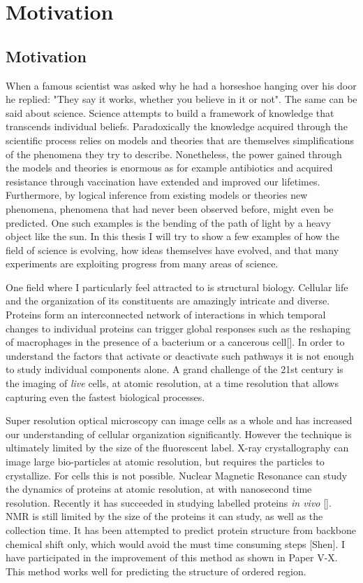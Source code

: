 \part{Motivation}
\chapter{Motivation}
When a famous scientist was asked why he had a horseshoe hanging over his door he replied: "They say it works, whether you believe in it or not". The same can be said about science. Science attempts to build a framework of knowledge that transcends individual beliefs. Paradoxically the knowledge acquired through the scientific process relies on models and theories that are themselves simplifications of the phenomena they try to describe. Nonetheless, the power gained through the models and theories is enormous as for example antibiotics and acquired resistance through vaccination have extended and improved our lifetimes. Furthermore, by logical inference from existing models or theories new phenomena, phenomena that had never been observed before, might even be predicted. One such examples is the bending of the path of light by a heavy object like the sun. In this thesis I will try to show a few examples of how the field of science is evolving, how ideas themselves have evolved, and that many experiments are exploiting progress from many areas of science.

One field where I particularly feel attracted to is structural biology. Cellular life and the organization of its constituents are amazingly intricate and diverse. Proteins form an interconnected network of interactions in which temporal changes to individual proteins can trigger global responses such as the reshaping of macrophages in the presence of a bacterium or a cancerous cell[]. In order to understand the factors that activate or deactivate such pathways it is not enough to study individual components alone. A grand challenge of the 21st century is the imaging of \textit{live} cells, at atomic resolution, at a time resolution that allows capturing even the fastest biological processes.

Super resolution optical microscopy can image cells as a whole and has increased our understanding of cellular organization significantly. However the technique is ultimately limited by the size of the fluorescent label. X-ray crystallography can image large bio-particles at atomic resolution, but requires the particles to crystallize. For cells this is not possible. Nuclear Magnetic Resonance can study the dynamics of proteins at atomic resolution, at with nanosecond time resolution. Recently it has succeeded in studying labelled proteins \textit{in vivo} []. NMR is still limited by the size of the proteins it can study, as well as the collection time. It has been attempted to predict protein structure from backbone chemical shift only, which would avoid the must time consuming steps [Shen]. I have participated in the improvement of this method as shown in Paper V-X. This method works well for predicting the structure of ordered region.

